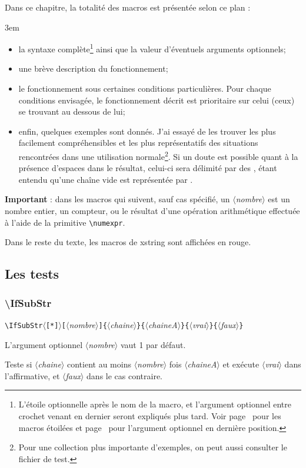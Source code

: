 \documentclass[a4paper,10pt,french]{article}
\newcommand\guill[1]{\og{}#1\fg{}}
\newcommand\argu[1]{$\langle$\textit{#1}$\rangle$}
\newcommand\ARGU[1]{\texttt{\color{black}\{}\argu{#1}\texttt{\color{black}\}}}
\newcommand\arguC[1]{\texttt{\color{black}[}\argu{#1}\texttt{\color{black}]}}
\newcommand\etoile{$\langle$\texttt{[*]}$\rangle$}
\newcommand\Xstring{\textsf{xstring}\xspace}
\newcommand\verbinline{\lstinline[basicstyle=\normalsize\ttfamily]}
\begin{document}
Dans ce chapitre, la totalité des macros est présentée selon ce plan :\par\nobreak\smallskip
\parindent3em
\begin{itemize}
	\item la syntaxe complète\footnote{L'étoile optionnelle après le nom de la macro, et l'argument optionnel entre crochet venant en dernier seront expliqués plus tard. Voir page~\pageref{macrosetoilees} pour les macros étoilées et page~\pageref{argumentoptionnel} pour l'argument optionnel en dernière position.} ainsi que la valeur d'éventuels arguments optionnels;
	\item une brève description du fonctionnement;
	\item le fonctionnement sous certaines conditions particulières. Pour chaque conditions envisagée, le fonctionnement décrit est prioritaire sur celui (ceux) se trouvant au dessous de lui;
	\item enfin, quelques exemples sont donnés. J'ai essayé de les trouver les plus facilement compréhensibles et les plus représentatifs des situations rencontrées dans une utilisation normale\footnote{Pour une collection plus importante d'exemples, on peut aussi consulter le fichier de test.}. Si un doute est possible quant à la présence d'espaces dans le résultat, celui-ci sera délimité par des \guill{\textbar}, étant entendu qu'une chaîne vide est représentée par \guill{\textbar\textbar}.
\end{itemize}
\parindent0pt\smallskip

\textbf{Important} : dans les macros qui suivent, sauf cas spécifié, un \argu{nombre} est un nombre entier, un compteur, ou le résultat d'une opération arithmétique effectuée à l'aide de la primitive \verb|\numexpr|.\smallskip

Dans le reste du texte, les macros de \Xstring sont affichées en {\makeatletter\color{@xs@keywordsxstring}rouge}.

\subsection{Les tests}
\subsubsection{\ttfamily\textbackslash IfSubStr}
\verbinline|\IfSubStr|\etoile\arguC{nombre}\ARGU{chaine}\ARGU{chaineA}\ARGU{vrai}\ARGU{faux}
\smallskip

L'argument optionnel \argu{nombre} vaut 1 par défaut.\par\nobreak\smallskip
Teste si \argu{chaine} contient au moins \argu{nombre} fois \argu{chaineA} et exécute \argu{vrai} dans l'affirmative, et \argu{faux} dans le cas contraire.\medskip
\end{document}
